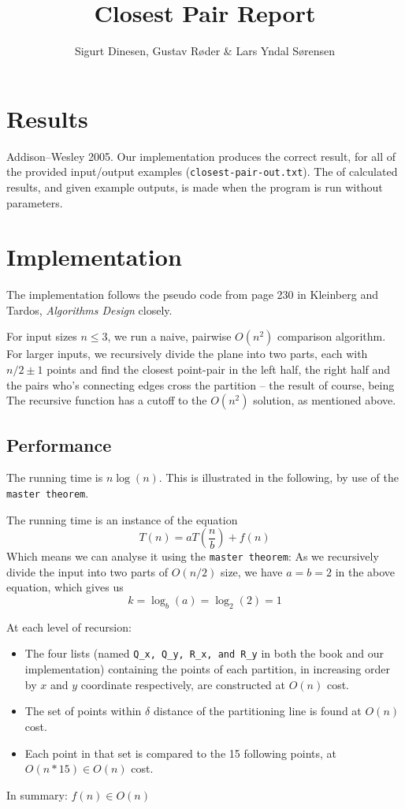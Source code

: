 \documentclass{tufte-handout}
\title{Closest Pair Report}
\author{Sigurt Dinesen, Gustav Røder \& Lars Yndal Sørensen}
\begin{document}
\maketitle

\section{Results}
Addison--Wesley 2005. Our implementation
produces the correct result, for all of the provided input/output examples
(\texttt{closest-pair-out.txt}). The of calculated results, and given
example outputs, is made when the program is run without parameters.

\section{Implementation}
The implementation follows the pseudo code from page 230 in Kleinberg and
Tardos, \emph{Algorithms Design} closely.

For input sizes $n \leq 3$, we run a naive, pairwise $O(n^2)$ comparison algorithm.
For larger inputs, we recursively divide the plane into two parts, each with
$n/2 \pm 1$ points and find the closest point-pair in the left half, the right
half and the pairs who's connecting edges cross the partition -- the result of
course, being  The recursive
function has a cutoff to the $O(n^2)$ solution, as mentioned above.

\subsection{Performance}
The running time is $n \log(n)$. This is illustrated in the following, by use of
the \texttt{master theorem}.

The running time is an instance of the equation
$$T(n) = a T\left(\frac{n}{b}\right) + f\left(n\right)$$
Which means we can analyse it using the \texttt{master theorem}:
As we recursively divide the input into two parts of $O(n/2)$ size, we have
$a=b=2$ in the above equation, which gives us
$$k = \log_b(a) = \log_2(2) = 1$$

At each level of recursion:
\begin{itemize}
	\item The four lists (named \texttt{Q\_x, Q\_y, R\_x, and R\_y} in both
		the book and our implementation) containing the points of each
		partition, in increasing order by $x$ and $y$ coordinate
		respectively, are constructed at $O(n)$ cost.

	\item The set of points within $\delta$ distance of the partitioning
		line is found at $O(n)$ cost.

	\item Each point in that set is compared to the 15 following points, at
		$O(n*15) \in O(n)$ cost.
\end{itemize}
In summary: $f\left(n\right) \in O(n)$
\end{document}
